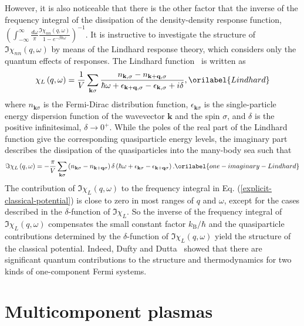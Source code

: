 \documentclass[aps,showkeys,noshowpacs,superscriptaddress,pre,preprint]{revtex4-2}
\let\label\orilabel
\begin{document}
However, it is also noticeable that there is the other factor that the inverse of the frequency integral of the dissipation of the density-density response function,
$\left( \int_{-\infty}^\infty \frac{d\omega}{\pi} \frac{\Im \chi_{nn} ( q, \omega )}{1 - e^{-\beta\hbar\omega}} \right)^{-1}$.
It is instructive to investigate the structure of $\Im \chi_{nn} ( q, \omega )$ by means of the Lindhard response theory,
which considers only the quantum effects of responses.
The Lindhard function~\cite{Lindhard1954} is written as~\cite{Giuliani-Vignale2005}
\begin{equation}
\chi_L \left( q, \omega \right) = \frac{1}{V}
\sum_{\mathbf{k} \sigma} \frac{n_{\mathbf{k}, \sigma} - n_{\mathbf{k}+\mathbf{q}, \sigma}}{
\hbar\omega + \epsilon_{\mathbf{k}+\mathbf{q}, \sigma} - \epsilon_{\mathbf{k}, \sigma}
+ i \delta } ,
\label{Lindhard}
\end{equation}
where $n_{\mathbf{k}\sigma}$ is the Fermi-Dirac distribution function, 
$\epsilon_{\mathbf{k}\sigma}$ is the single-particle energy dispersion function of the wavevector $\mathbf{k}$ and the spin $\sigma$,
and $\delta$ is the positive infinitesimal, $\delta \rightarrow 0^+$.
While the poles of the real part of the Lindhard function give the corresponding quasiparticle energy levels,
the imaginary part describes the dissipation of the quasiparticles into the many-body sea such that
\begin{equation}
\Im \chi_L \left( q, \omega \right) = - \frac{\pi}{V}
\sum_{\mathbf{k}\sigma} \left( n_{\mathbf{k}\sigma} - n_{\mathbf{k}+\mathbf{q}\sigma} \right)
\delta \left( \hbar\omega + \epsilon_{\mathbf{k}\sigma} - \epsilon_{\mathbf{k}+\mathbf{q}\sigma} \right) .
\label{one-imaginary-Lindhard}
\end{equation}
The contribution of $\Im \chi_L ( q, \omega )$ to the frequency integral in Eq. (\ref{explicit-classical-potential})
is close to zero in most ranges of $q$ and $\omega$, 
except for the cases described in the $\delta$-function of $\Im \chi_L$.
So the inverse of the frequency integral of $\Im \chi_L  ( q, \omega )$ compensates the small constant factor $k_\mathrm{B}/\hbar$
and the quasiparticle contributions determined by the $\delta$-function of $\Im \chi_L ( q, \omega )$ yield the structure of the classical potential.
Indeed, Dufty and Dutta~\cite{Dufty-Dutta2013} showed that there are significant quantum contributions 
to the structure and thermodynamics for two kinds of one-component Fermi systems.

\section{Multicomponent plasmas}
\label{sec:multicomponent}
\end{document}

